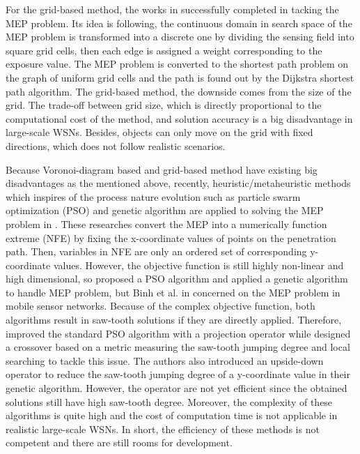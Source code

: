 \documentclass[final]{elsarticle}
\begin{document}
For the grid-based method, the works in \cite{meguerdichian2001exposure, veltri2003minimal,megerian2002exposure, b9, b10} successfully completed in tacking the MEP problem. Its idea is following, the continuous domain in search space of the MEP problem is transformed into a discrete one by dividing the sensing field into square grid cells, then each edge is assigned a weight corresponding to the exposure value. The MEP problem is converted to the shortest path problem on the graph of uniform grid cells and the path is found out by the Dijkstra shortest path algorithm. The grid-based method, the downside comes from the size of the grid. The trade-off between grid size, which is directly proportional to the computational cost of the method, and solution accuracy is a big disadvantage in large-scale WSNs. Besides, objects can only move on the grid with fixed directions, which does not follow realistic scenarios.

Because Voronoi-diagram based and grid-based method have existing big disadvantages as the mentioned above, recently, heuristic/metaheuristic methods which inspires of the process nature evolution such as particle swarm optimization (PSO) and genetic algorithm are applied to solving the MEP problem in \cite{b11,b12,b25,binh2019efficient}. These researches convert the MEP into a numerically function extreme (NFE) \cite{b8} by fixing the x-coordinate values of points on the penetration path. Then, variables in NFE are only an ordered set of corresponding y-coordinate values. However, the objective function is still highly non-linear and high dimensional, so \cite{b11} proposed a PSO algorithm and \cite {b12,b25,binh2019efficient} applied a genetic algorithm to handle MEP problem, but Binh et al. in \cite{b25} concerned on the MEP problem in mobile sensor networks. Because of the complex objective function, both algorithms result in saw-tooth solutions if they are directly applied. Therefore, \cite{b11} improved the standard PSO algorithm with a projection operator while \cite{binh2019efficient} designed a crossover based on a metric measuring the saw-tooth jumping degree and local searching to tackle this issue. The authors \cite{b12} also introduced an upside-down operator to reduce the saw-tooth jumping degree of a y-coordinate value in their genetic algorithm. However, the operator are not yet efficient since the obtained solutions still have high saw-tooth degree. Moreover, the complexity of these algorithms is quite high and the cost of computation time is not applicable in realistic large-scale WSNs. In short, the efficiency of these methods is not competent and there are still rooms for development.
\end{document}
